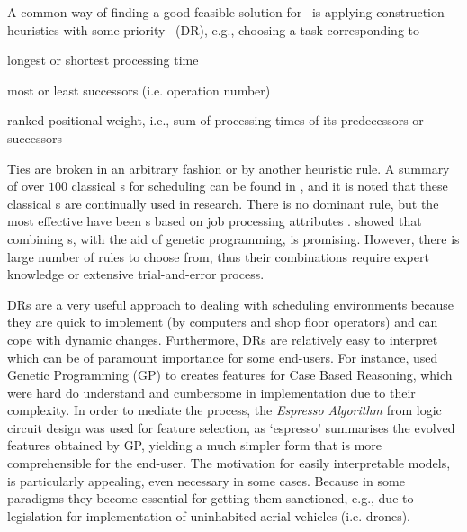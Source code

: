 A common way of finding a good feasible solution for \JSP\ is 
applying construction heuristics with some priority \dr\ (DR), e.g., choosing a 
task corresponding to
\begin{enumerate*}[itemjoin*={{, or }}]
  \item longest or shortest processing time
  \item most or least successors (i.e. operation number)
  \item ranked positional weight, i.e., sum of processing times of its 
  predecessors or successors
\end{enumerate*} 
Ties are broken in an arbitrary fashion or by another heuristic rule.
A summary of over $100$ classical \dr s for scheduling can be found in 
\citet{Panwalkar77}, and it is noted that these classical \dr s are continually 
used in research.  
There is no dominant rule, but the most effective have been \sdr s based on job 
processing attributes \citep{Haupt89}. \citet{Tay08} showed that combining \dr 
s, with the aid of genetic programming, is promising. However, there is large 
number of rules to choose from, thus their combinations require expert 
knowledge or extensive trial-and-error process.

DRs are a very useful approach to dealing with scheduling 
environments because they are quick to implement (by computers and shop floor 
operators) and can cope with dynamic changes. 
Furthermore, DRs are relatively easy to interpret which can be of paramount 
importance for some end-users.
For instance, \citet{Keane15} used Genetic Programming (GP) to creates features 
for Case Based Reasoning, which were hard do understand and cumbersome in 
implementation due to their complexity. In order to mediate the process, the 
\emph{Espresso Algorithm}  from logic circuit design was used for feature 
selection,  as `espresso' summarises the evolved features obtained by GP, 
yielding a much simpler form that is more comprehensible for the end-user.
The motivation for easily interpretable models, is particularly appealing, 
even necessary in some cases. Because in some paradigms they become 
essential for getting them sanctioned, e.g., due to legislation for 
implementation of uninhabited aerial vehicles (i.e. drones).

